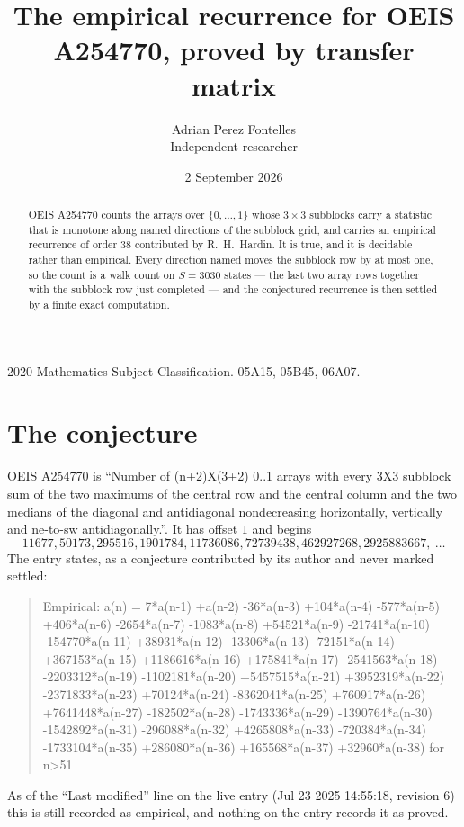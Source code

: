 \documentclass[11pt,a4paper]{article}
\title{The empirical recurrence for OEIS A254770, proved by transfer matrix}
\author{Adrian Perez Fontelles\\ \small Independent researcher}
\date{2 September 2026}
\theoremstyle{plain}
\theoremstyle{definition}
\begin{document}
\maketitle

\begin{abstract}
OEIS A254770 counts the arrays over $\{0,\dots,1\}$ whose $3\times3$ subblocks carry a
statistic that is monotone along named directions of the subblock grid, and carries an
empirical recurrence of order $38$ contributed by R.~H.~Hardin. It is true, and it is
decidable rather than empirical. Every direction named moves the subblock row by at most one,
so the count is a walk count on $S=3030$ states --- the last two array rows together with the
subblock row just completed --- and the conjectured recurrence is then settled by a finite
exact computation.
\end{abstract}

\noindent\small 2020 Mathematics Subject Classification. 05A15, 05B45, 06A07.\normalsize

\section{The conjecture}

OEIS A254770 is ``Number of (n+2)X(3+2) 0..1 arrays with every 3X3 subblock sum of the two maximums of the central row and the central column and the two medians of the diagonal and antidiagonal nondecreasing horizontally, vertically and ne-to-sw antidiagonally.''. It has offset $1$ and begins
\[
11677, 50173, 295516, 1901784, 11736086, 72739438, 462927268, 2925883667,\ \dots
\]
The entry states, as a conjecture contributed by its author and never marked settled:
\begin{quote}
Empirical: a(n) = 7*a(n-1) +a(n-2) -36*a(n-3) +104*a(n-4) -577*a(n-5) +406*a(n-6) -2654*a(n-7) -1083*a(n-8) +54521*a(n-9) -21741*a(n-10) -154770*a(n-11) +38931*a(n-12) -13306*a(n-13) -72151*a(n-14) +367153*a(n-15) +1186616*a(n-16) +175841*a(n-17) -2541563*a(n-18) -2203312*a(n-19) -1102181*a(n-20) +5457515*a(n-21) +3952319*a(n-22) -2371833*a(n-23) +70124*a(n-24) -8362041*a(n-25) +760917*a(n-26) +7641448*a(n-27) -182502*a(n-28) -1743336*a(n-29) -1390764*a(n-30) -1542892*a(n-31) -296088*a(n-32) +4265808*a(n-33) -720384*a(n-34) -1733104*a(n-35) +286080*a(n-36) +165568*a(n-37) +32960*a(n-38) for n>51
\end{quote}
As of the ``Last modified'' line on the live entry (Jul 23 2025 14:55:18, revision 6) this is still
recorded as empirical, and nothing on the entry records it as proved.
\end{document}
